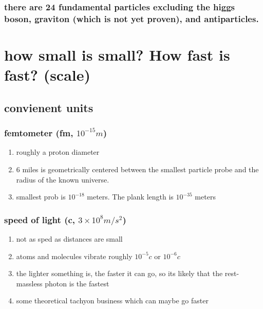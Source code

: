 \documentclass[letterpaper]{article}
\begin{document}
\subsubsection{there are 24 fundamental particles excluding the higgs boson, graviton (which is not yet proven), and antiparticles.}
\label{sec:org13ae0c2}

\section{how small is small? How fast is fast? (scale)}
\label{sec:orgb862d1a}
\subsection{convienent units}
\label{sec:org958b396}
\subsubsection{femtometer (fm, \(10^{-15} m\))}
\label{sec:orga9ee2a4}
\begin{enumerate}
\item roughly a proton diameter
\label{sec:org212c559}
\item 6 miles is geometrically centered between the smallest particle probe and the radius of the known universe.
\label{sec:org0b6b4df}
\item smallest prob is \(10^{-18}\) meters. The plank length is \(10^{-35}\) meters
\label{sec:org0abf731}
\end{enumerate}
\subsubsection{speed of light (c, \(3 \times 10^8 m/s^2\))}
\label{sec:orgdcbfef1}
\begin{enumerate}
\item not as sped as distances are small
\label{sec:org5e00ce7}
\item atoms and molecules vibrate roughly \(10^{-5} c\) or \(10^{-6} c\)
\label{sec:org6994f76}
\item the lighter something is, the faster it can go, so its likely that the rest-massless photon is the fastest
\label{sec:orgbf9b962}
\item some theoretical tachyon business which can maybe go faster
\label{sec:orgce86b59}
\end{enumerate}
\end{document}
